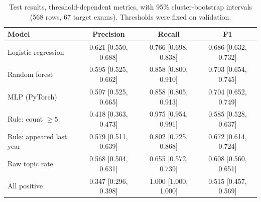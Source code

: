 \documentclass[11pt,a4paper]{article}
\begin{document}
\begin{table}[!htb]
\centering
\small
{}
\caption{Validation results (301 rows, 36 target exams). Thresholds of the learned models and of the raw topic rate
maximise F1 on this split; the other rules keep their fixed threshold. This table is therefore optimistic for them.}
\label{tab:val}
\end{table}

\begin{table}[!htb]
\centering
\small
\begin{tabular}{lccc}
\toprule
Model & Precision & Recall & F1 \\
\midrule
Logistic regression & 0.621 [0.550, 0.688] & 0.766 [0.698, 0.838] & 0.686 [0.632, 0.732] \\
Random forest & 0.595 [0.525, 0.662] & 0.858 [0.800, 0.910] & 0.703 [0.654, 0.745] \\
MLP (PyTorch) & 0.597 [0.525, 0.665] & 0.858 [0.805, 0.913] & 0.704 [0.652, 0.749] \\
\midrule
Rule: count $\geq 5$ & 0.418 [0.363, 0.473] & 0.975 [0.954, 0.991] & 0.585 [0.528, 0.637] \\
Rule: appeared last year & 0.579 [0.511, 0.639] & 0.802 [0.725, 0.868] & 0.672 [0.614, 0.724] \\
Raw topic rate & 0.568 [0.504, 0.631] & 0.655 [0.572, 0.739] & 0.608 [0.560, 0.651] \\
All positive & 0.347 [0.296, 0.398] & 1.000 [1.000, 1.000] & 0.515 [0.457, 0.569] \\
\bottomrule
\end{tabular}
\caption{Test results, threshold-dependent metrics, with 95\% cluster-bootstrap intervals (568 rows, 67 target exams).
Thresholds were fixed on validation.}
\label{tab:testA}
\end{table}
\end{document}
